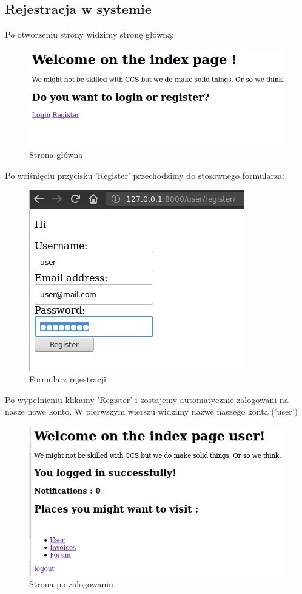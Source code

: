 \documentclass[12pt]{article}
\begin{document}
\subsection{Rejestracja w systemie}
Po otworzeniu strony widzimy stronę główną:
\begin{figure}[H]
	\centering
	\includegraphics[scale=0.5]{img/1.png}
	\caption{Strona główna}
\end{figure}
Po wciśnięciu przycisku 'Register' przechodzimy do stosownego formularza:
\begin{figure}[H]
	\centering
	\includegraphics[scale=0.5]{img/2.png}
	\caption{Formularz rejestracji}
\end{figure}
Po wypełnieniu klikamy 'Register' i zostajemy automatycznie zalogowani na nasze nowe konto. W pierwszym wierszu widzimy nazwę naszego konta ('user')
\begin{figure}[H]
	\centering
	\includegraphics[scale=0.5]{img/3.png}
	\caption{Strona po zalogowaniu}
\end{figure}
\end{document}
